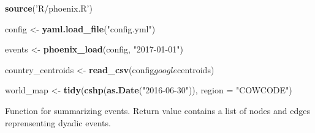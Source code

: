 \documentclass[]{article}
\newenvironment{Shaded}{\begin{snugshade}}{\end{snugshade}}
\newcommand{\KeywordTok}[1]{\textcolor[rgb]{0.13,0.29,0.53}{\textbf{{#1}}}}
\newcommand{\DataTypeTok}[1]{\textcolor[rgb]{0.13,0.29,0.53}{{#1}}}
\newcommand{\StringTok}[1]{\textcolor[rgb]{0.31,0.60,0.02}{{#1}}}
\newcommand{\NormalTok}[1]{{#1}}
\begin{document}
\begin{Shaded}
\begin{Highlighting}[]
\KeywordTok{source}\NormalTok{(}\StringTok{'R/phoenix.R'}\NormalTok{)}

\NormalTok{config <-}\StringTok{ }\KeywordTok{yaml.load_file}\NormalTok{(}\StringTok{"config.yml"}\NormalTok{)}

\NormalTok{events <-}\StringTok{ }\KeywordTok{phoenix_load}\NormalTok{(config, }\StringTok{"2017-01-01"}\NormalTok{)}

\NormalTok{country_centroids <-}\StringTok{ }\KeywordTok{read_csv}\NormalTok{(config$google$centroids)}

\NormalTok{world_map <-}\StringTok{ }\KeywordTok{tidy}\NormalTok{(}\KeywordTok{cshp}\NormalTok{(}\KeywordTok{as.Date}\NormalTok{(}\StringTok{"2016-06-30"}\NormalTok{)), }\DataTypeTok{region =} \StringTok{"COWCODE"}\NormalTok{)}
\end{Highlighting}
\end{Shaded}

Function for summarizing events. Return value contains a list of nodes
and edges reprensenting dyadic events.
\end{document}
